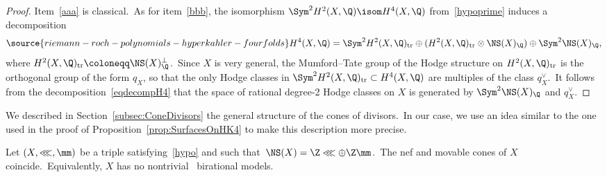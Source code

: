 \begin{proof}
 Item~\ref{aaa} is classical.\ As for   item~\ref{bbb}, the isomorphism $\Sym^2H^2(X,\Q)\isom H^4(X,\Q)$ from~\eqref{hypoprime} induces a decomposition
\begin{eqnarray}\label{eqdecompH4}
\source{riemann-roch-polynomials-hyperkahler-fourfolds}
H^4(X,\Q)={\Sym}^2H^2(X,\Q)_{\rm tr}\oplus (H^2(X,\Q)_{\rm tr}\otimes \NS(X)_{\Q})\oplus {\Sym}^2{\NS}(X)_{\Q},
\end{eqnarray}
where $H^2(X,\Q)_{\rm tr}\coloneqq \NS(X)_{\Q}^\perp$.\ Since  $X$ is very general, the Mumford--Tate group of the Hodge structure on $H^2(X,\Q)_{\rm tr}$ is the orthogonal group of the  form $q_X$, so that the only Hodge classes in ${\Sym}^2H^2(X,\Q)_{\rm tr}\subset H^4(X,\Q)$ are multiples of the class $q_X^\vee$.\ It follows from the decomposition~\eqref{eqdecompH4} that the space of rational degree-2 Hodge classes on $X$ is generated by ${\Sym}^2{\NS}(X)_{\Q}$ and $q_X^\vee$.
\end{proof}

We described in   Section~\ref{subsec:ConeDivisors} the general structure of the cones of divisors.\ In our case, we use an idea similar to the one used in the proof of   Proposition~\ref{prop:SurfacesOnHK4} to make this description more precise.

\begin{prop}
\notready\label{lem:NefCone4folds}
Let $(X,\lll,\mm)$ be a triple satisfying~\eqref{hypo} and such that~$\NS(X)=\Z\lll\oplus\Z\mm$.\
The nef and movable cones of $X$ coincide.\
Equivalently, $X$ has no nontrivial \hk\ birational models.
\end{prop}



